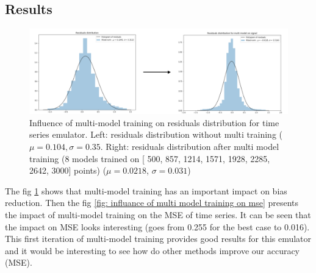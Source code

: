 \documentclass{article}
\begin{document}
\subsection{Results}
\begin{figure}[H]
\centering
\includegraphics[scale=0.5]{image/multi-model-signal.png}
\caption{Influence of multi-model training on residuals distribution for time series emulator. Left: residuals distribution without multi training ($\mu = 0.104 , \sigma = 0.35$. Right: residuals distribution after multi model training (8 models trained on [ 500,  857, 1214, 1571, 1928, 2285, 2642, 3000] points) ($\mu = 0.0218$, $\sigma =0.031$) }
\label{fig: influance of multi model training on mu}
\end{figure}

The fig \ref{fig: influance of multi model training on mu} shows that multi-model training has an important impact on bias reduction. Then the fig \ref{fig: influance of multi model training on mse} presents the impact of multi-model training on the MSE of time series. It can be seen that the impact on MSE looks interesting (goes from 0.255 for the best case to 0.016). This first iteration of multi-model training provides good results for this emulator and it would be interesting to see how do other methods improve our accuracy (MSE).
\end{document}
